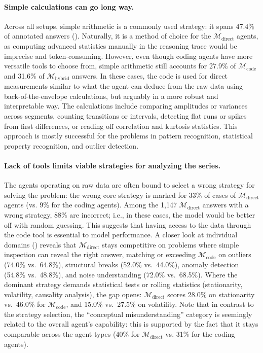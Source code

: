 \documentclass[11pt]{article}
\newcommand{\mdirect}{$\mathcal{M}_{\text{direct}}$}
\newcommand{\mcode}{$\mathcal{M}_{\text{code}}$}
\newcommand{\mhybrid}{$\mathcal{M}_{\text{hybrid}}$}
\begin{document}
\paragraph{Simple calculations can go long way.}
Across all setups, simple arithmetic is a commonly used strategy: it spans 47.4\% of annotated answers (). Naturally, it is a method of choice for the \mdirect{} agents, as computing advanced statistics manually in the reasoning trace would be imprecise and token-consuming. However, even though coding agents have more versatile tools to choose from, simple arithmetic still accounts for 27.9\% of \mcode{} and 31.6\% of \mhybrid{} answers. In these cases, the code is used for direct measurements similar to what the agent can deduce from the raw data using back-of-the-envelope calculations, but arguably in a more robust and interpretable way. The calculations include comparing amplitudes or variances across segments, counting transitions or intervals, detecting flat runs or spikes from first differences, or reading off correlation and kurtosis statistics. This approach is mostly successful for the problems in pattern recognition, statistical property recognition, and outlier detection.


\paragraph{Lack of tools limits viable strategies for analyzing the series.} The agents operating on raw data are often bound to select a wrong strategy for solving the problem: the wrong core strategy is marked for 33\% of cases of \mdirect{} agents (vs. 9\% for the coding agents). Among the 1{,}147 \mdirect{} answers with a wrong strategy, 88\% are incorrect; i.e., in these cases, the model would be better off with random guessing. This suggests that having access to the data through the code tool is essential to model performance. A closer look at individual domains () reveals that \mdirect{} stays competitive on problems where simple inspection can reveal the right answer, matching or exceeding \mcode{} on outliers (74.0\% vs.\ 64.8\%), structural breaks (52.0\% vs.\ 44.0\%), anomaly detection (54.8\% vs.\ 48.8\%), and noise understanding (72.0\% vs.\ 68.5\%).  Where the dominant strategy demands statistical tests or rolling statistics (stationarity, volatility, causality analysis), the gap opens: \mdirect{} scores 28.0\% on stationarity vs.\ 46.0\% for \mcode{}, and 15.0\% vs.\ 27.5\% on volatility. Note that in contrast to the strategy selection, the ``conceptual misunderstanding'' category is seemingly related to the overall agent's capability: this is supported by the fact that it stays comparable across the agent types (40\% for \mdirect{} vs. 31\% for the coding agents).
\end{document}
